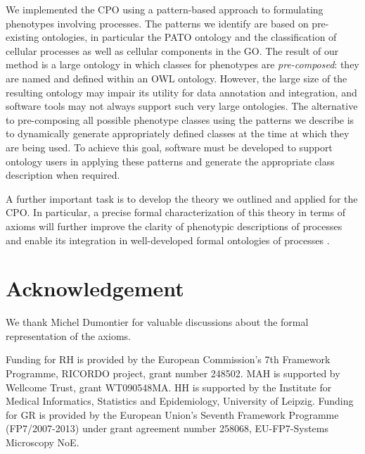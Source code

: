 \documentclass{bioinfo}
\renewcommand{\cite}{\citep}
\begin{document}
We implemented the CPO using a pattern-based approach to formulating
phenotypes involving processes. The patterns we identify are based on
pre-existing ontologies, in particular the PATO ontology and the
classification of cellular processes as well as cellular components in
the GO. The result of our method is a large ontology in which classes
for phenotypes are {\em pre-composed}: they are named and defined
within an OWL ontology. However, the large size of the resulting
ontology may impair its utility for data annotation and integration,
and software tools may not always support such very large
ontologies. The alternative to pre-composing all possible phenotype
classes using the patterns we describe is to dynamically generate
appropriately defined classes at the time at which they are being
used. To achieve this goal, software must be developed to support
ontology users in applying these patterns and generate the appropriate
class description when required.

A further important task is to develop the theory we outlined and
applied for the CPO. In particular, a precise formal characterization
of this theory in terms of axioms will further improve the clarity of
phenotypic descriptions of processes and enable its integration in
well-developed formal ontologies of processes \cite{Herre2006,
  Gruninger2010}.

\section{Acknowledgement}
We thank Michel Dumontier for valuable discussions about the formal
representation of the axioms.

Funding for RH is provided by the European Commission's 7th Framework
Programme, RICORDO project, grant number 248502. MAH is supported by
Wellcome Trust, grant WT090548MA. HH is supported by the Institute for
Medical Informatics, Statistics and Epidemiology, University of
Leipzig.  Funding for GR is provided by the European Union's Seventh
Framework Programme (FP7/2007-2013) under grant agreement number
258068, EU-FP7-Systems Microscopy NoE. 




\end{document}
